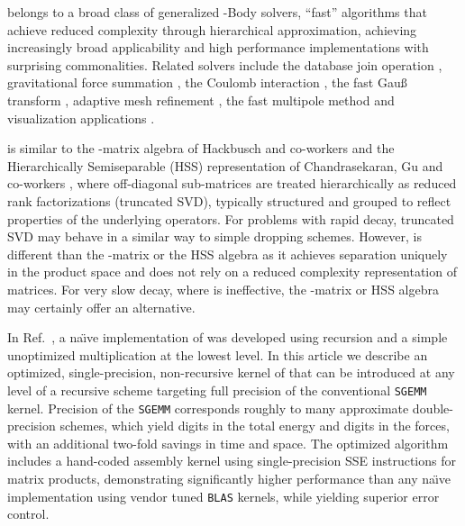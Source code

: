 \SpAMM{} belongs to a broad class of generalized -Body solvers, ``fast''
algorithms that achieve reduced complexity through hierarchical approximation,
achieving increasingly broad applicability and high performance
implementations with surprising commonalities. Related solvers include the
database join operation \cite{Mishra:1992:JPR:128762.128764,
Schneider:1990:TPC:94362.94514, Chen:2007:IHJ:1272743.1272747,
Kim:2009:SVH:1687553.1687564}, gravitational force summation
\cite{10.1109/SUPERC.1992.236647, Warren:1993:PHO:169627.169640,
Warren:1995:HOTb}, the Coulomb interaction \cite{Challacombe:1996:QCTCb,
schwegler:8764}, the fast Gau\ss{} transform \cite{greengard:79, strain:1131,
baxter:257, yang2003:FGT, Wan20067}, adaptive mesh refinement
\cite{Berger1984484, bell:127, Berger198964}, the fast multipole method
\cite{Greengard1987325, Greengard1997, Cheng1999468,
springerlink:10.1007/BFb0089775} and visualization applications
\cite{CGF:CGF1554, CGF:CGF1775, Lefebvre:2006:PSH:1141911.1141926,
Lefebvre:2006:PSH:1179352.1141926, AVRIL:2009:HAL-00412870:1, Zou2008,
694268}.

\SpAMM{} is similar to the -matrix algebra of Hackbusch and
co-workers \cite{Hackbusch2002, Grasedyck2003} and the Hierarchically
Semiseparable (HSS) representation of Chandrasekaran, Gu and co-workers
\cite{Chandrasekaran2005, Chandrasekaran2006}, where off-diagonal sub-matrices
are treated hierarchically as reduced rank factorizations (truncated SVD),
typically structured and grouped to reflect properties of the underlying
operators. For problems with rapid decay, truncated SVD may behave in a
similar way to simple dropping schemes. However, \SpAMM{} is different than
the -matrix or the HSS algebra as it achieves separation uniquely
in the product space and does not rely on a reduced complexity representation
of matrices.  For very slow decay, where \SpAMM{} is ineffective, the
-matrix or HSS algebra may certainly offer an alternative.

In Ref.~\cite{ChallacombeBock2010}, a na\"{\i}ve implementation of \SpAMM{}
was developed using recursion and a simple unoptimized 
multiplication at the lowest level. In this article we describe an optimized,
single-precision, non-recursive kernel of \SpAMM{} that can be introduced at
any level of a recursive scheme targeting full precision of the conventional
{\tt SGEMM} kernel. Precision of the {\tt SGEMM} corresponds roughly to many
approximate double-precision  schemes, which yield  digits in the total energy and  digits in the forces, with an
additional two-fold savings in time and space.  The optimized algorithm
includes a hand-coded assembly kernel using single-precision SSE instructions
for  matrix products, demonstrating significantly higher
performance than any na\"{\i}ve implementation using vendor tuned {\tt BLAS}
kernels, while yielding superior error control.

